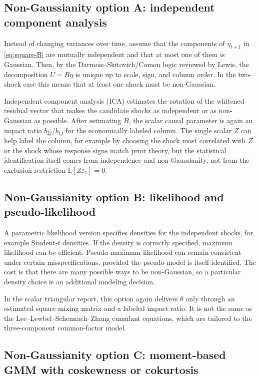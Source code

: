 \documentclass[11pt]{article}
\newcommand{\E}{\mathbb{E}}
\theoremstyle{plain}
\theoremstyle{definition}
\theoremstyle{remark}
\begin{document}
\subsection{Non-Gaussianity option A: independent component analysis}

Instead of changing variances over time, assume that the components of
$\eta_{t+1}$ in \eqref{eq:square-B} are mutually independent and that at most one
of them is Gaussian. Then, by the Darmois--Skitovich/Comon logic reviewed by
Lewis, the decomposition $U=B\eta$ is unique up to scale, sign, and column order.
In the two-shock case this means that at least one shock must be non-Gaussian.

Independent component analysis (ICA) estimates the rotation of the whitened
residual vector that makes the candidate shocks as independent or as
non-Gaussian as possible. After estimating $B$, the scalar causal parameter is
again an impact ratio $b_{2j}/b_{1j}$ for the economically labeled column. The
single scalar $Z$ can help label the column, for example by choosing the shock
most correlated with $Z$ or the shock whose response signs match prior theory,
but the statistical identification itself comes from independence and
non-Gaussianity, not from the exclusion restriction $\E[Z\varepsilon_1]=0$.

\subsection{Non-Gaussianity option B: likelihood and pseudo-likelihood}

A parametric likelihood version specifies densities for the independent shocks,
for example Student-$t$ densities. If the density is correctly specified,
maximum likelihood can be efficient. Pseudo-maximum likelihood can remain
consistent under certain misspecifications, provided the pseudo-model is itself
identified. The cost is that there are many possible ways to be non-Gaussian, so
a particular density choice is an additional modeling decision.

In the scalar triangular report, this option again delivers $\theta$ only through
an estimated square mixing matrix and a labeled impact ratio. It is not the same
as the Lee--Lewbel--Schennach--Zhang cumulant equations, which are tailored to
the three-component common-factor model.

\subsection{Non-Gaussianity option C: moment-based GMM with coskewness or cokurtosis}
\end{document}
